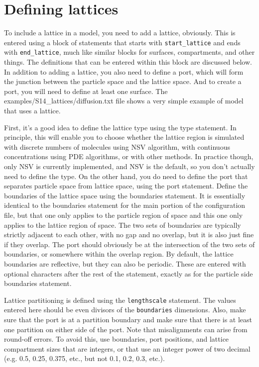 \documentclass {scrbook}
\newcommand {\ttt} {\texttt}
\begin{document}
\section{Defining lattices}

To include a lattice in a model, you need to add a lattice, obviously. This is entered using a block of statements that starts with \ttt{start\_lattice} and ends with \ttt{end\_lattice}, much like similar blocks for surfaces, compartments, and other things. The definitions that can be entered within this block are discussed below. In addition to adding a lattice, you also need to define a port, which will form the junction between the particle space and the lattice space. And to create a port, you will need to define at least one surface. The examples/S14\_lattices/diffusion.txt file shows a very simple example of model that uses a lattice.

First, it's a good idea to define the lattice type using the type statement. In principle, this will enable you to choose whether the lattice region is simulated with discrete numbers of molecules using NSV algorithm, with continuous concentrations using PDE algorithms, or with other methods. In practice though, only NSV is currently implemented, and NSV is the default, so you don't actually need to define the type. On the other hand, you do need to define the port that separates particle space from lattice space, using the port statement.
Define the boundaries of the lattice space using the boundaries statement. It is essentially identical to the boundaries statement for the main portion of the configuration file, but that one only applies to the particle region of space and this one only applies to the lattice region of space. The two sets of boundaries are typically strictly adjacent to each other, with no gap and no overlap, but it is also just fine if they overlap. The port should obviously be at the intersection of the two sets of boundaries, or somewhere within the overlap region. By default, the lattice boundaries are reflective, but they can also be periodic. These are entered with optional characters after the rest of the statement, exactly as for the particle side boundaries statement.

Lattice partitioning is defined using the \ttt{lengthscale} statement. The values entered here should be even divisors of the \ttt{boundaries} dimensions. Also, make sure that the port is at a partition boundary and make sure that there is at least one partition on either side of the port. Note that misalignments can arise from round-off errors. To avoid this, use boundaries, port positions, and lattice compartment sizes that are integers, or that use an integer power of two decimal (e.g. 0.5, 0.25, 0.375, etc., but not 0.1, 0.2, 0.3, etc.).
\end{document}
